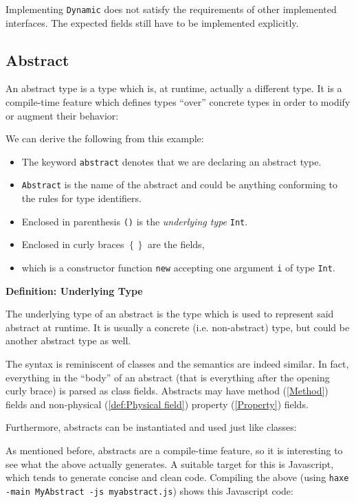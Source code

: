 \documentclass{article}
\newcommand{\target}[1]{#1}
\newcommand{\type}[1]{\texttt{#1}}
\newcommand{\expr}[1]{\texttt{#1}}
\newenvironment{myshaded}
  {\def\FrameCommand{\fboxsep=\topsep\colorbox{bgcolor}}%
  \MakeFramed {\advance\hsize-\width \FrameRestore}}%
 {\endMakeFramed}
\newcommand{\define}[3][Definition]
	{\begin{myshaded}\noindent\textbf{#1: #2}\par\nobreak\noindent\ignorespaces#3\label{def:#2}\end{myshaded}}
\newcommand{\tref}[2]{#1 (\ref{#2})}
\begin{document}

Implementing \type{Dynamic} does not satisfy the requirements of other implemented interfaces. The expected fields still have to be implemented explicitly.





\subsection{Abstract}
\label{Abstract}

An abstract type is a type which is, at runtime, actually a different type. It is a compile-time feature which defines types ``over'' concrete types in order to modify or augment their behavior:


We can derive the following from this example:

\begin{itemize}
	\item The keyword \expr{abstract} denotes that we are declaring an abstract type.
	\item \type{Abstract} is the name of the abstract and could be anything conforming to the rules for type identifiers.
	\item Enclosed in parenthesis \expr{()} is the \emph{underlying type} \type{Int}.
	\item Enclosed in curly braces \expr{$\left\{\right\}$} are the fields,
	\item which is a constructor function \expr{new} accepting one argument \expr{i} of type \type{Int}.
\end{itemize}

\define{Underlying Type}{The underlying type of an abstract is the type which is used to represent said abstract at runtime. It is usually a concrete (i.e. non-abstract) type, but could be another abstract type as well.}

The syntax is reminiscent of classes and the semantics are indeed similar. In fact, everything in the ``body'' of an abstract (that is everything after the opening curly brace) is parsed as class fields. Abstracts may have \tref{method}{Method} fields and non-\tref{physical}{def:Physical field} \tref{property}{Property} fields.

Furthermore, abstracts can be instantiated and used just like classes:


As mentioned before, abstracts are a compile-time feature, so it is interesting to see what the above actually generates. A suitable target for this is \target{Javascript}, which tends to generate concise and clean code. Compiling the above (using \texttt{haxe -main MyAbstract -js myabstract.js}) shows this \target{Javascript} code:
\end{document}

